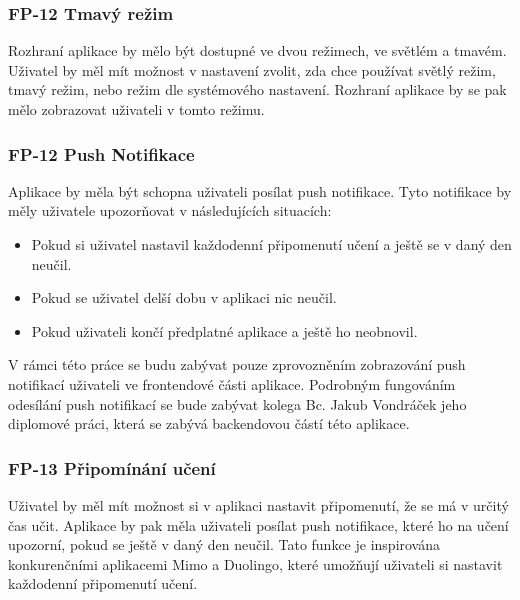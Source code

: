\subsubsection{FP-12 Tmavý režim}

Rozhraní aplikace by mělo být dostupné ve dvou režimech, ve světlém a tmavém. Uživatel by měl mít možnost v nastavení zvolit, zda chce používat světlý režim, tmavý režim, nebo režim dle systémového nastavení. Rozhraní aplikace by se pak mělo zobrazovat uživateli v tomto režimu. 

\subsubsection{FP-12 Push Notifikace}

Aplikace by měla být schopna uživateli posílat push notifikace. %
Tyto notifikace by měly uživatele upozorňovat v následujících situacích:

\begin{itemize}
    \item Pokud si uživatel nastavil každodenní připomenutí učení a ještě se v daný den neučil.
    \item Pokud se uživatel delší dobu v aplikaci nic neučil.
    \item Pokud uživateli končí předplatné aplikace a ještě ho neobnovil.
\end{itemize}

V rámci této práce se budu zabývat pouze zprovozněním zobrazování push notifikací uživateli ve frontendové části aplikace. Podrobným fungováním odesílání push notifikací se bude zabývat kolega Bc. Jakub Vondráček jeho diplomové práci, která se zabývá backendovou částí této aplikace. %

\subsubsection{FP-13 Připomínání učení}

Uživatel by měl mít možnost si v aplikaci nastavit připomenutí, že se má v určitý čas učit. Aplikace by pak měla uživateli posílat push notifikace, které ho na učení upozorní, pokud se ještě v daný den neučil. Tato funkce je inspirována konkurenčními aplikacemi Mimo a Duolingo, které umožňují uživateli si nastavit každodenní připomenutí učení.

